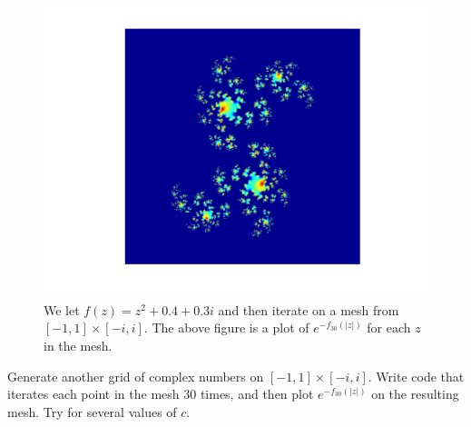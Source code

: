 \begin{figure}\label{Fig:julia}
\begin{center}
\includegraphics[scale=0.5]{julia}
\caption{We let $f(z) = z^2 + 0.4 + 0.3i$ and then iterate on a mesh from $[-1,1]\times[-i,i]$.  The above figure is a plot of $e^{-f_{30}(|z|)}$ for each $z$ in the mesh.}
\end{center}
\end{figure}


\begin{problem}
Generate another grid of complex numbers on $[-1,1]\times[-i,i]$.  Write code that iterates each point in the mesh 30 times, and then plot $e^{-f_{30}(|z|)}$ on the resulting mesh.  Try for several values of $c$.
\end{problem}
